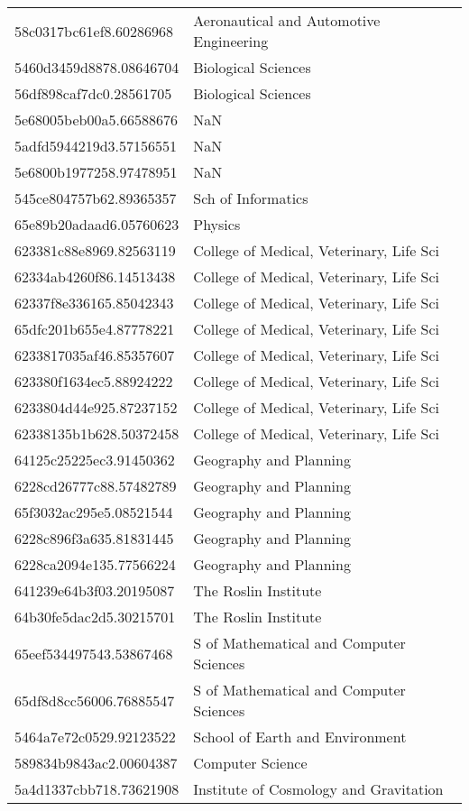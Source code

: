 \begin{tabular}{ll}
58c0317bc61ef8.60286968 & Aeronautical and Automotive Engineering \\
5460d3459d8878.08646704 & Biological Sciences \\
56df898caf7dc0.28561705 & Biological Sciences \\
5e68005beb00a5.66588676 & NaN \\
5adfd5944219d3.57156551 & NaN \\
5e6800b1977258.97478951 & NaN \\
545ce804757b62.89365357 & Sch of Informatics \\
65e89b20adaad6.05760623 & Physics \\
623381c88e8969.82563119 & College of Medical, Veterinary, Life Sci \\
62334ab4260f86.14513438 & College of Medical, Veterinary, Life Sci \\
62337f8e336165.85042343 & College of Medical, Veterinary, Life Sci \\
65dfc201b655e4.87778221 & College of Medical, Veterinary, Life Sci \\
6233817035af46.85357607 & College of Medical, Veterinary, Life Sci \\
623380f1634ec5.88924222 & College of Medical, Veterinary, Life Sci \\
6233804d44e925.87237152 & College of Medical, Veterinary, Life Sci \\
62338135b1b628.50372458 & College of Medical, Veterinary, Life Sci \\
64125c25225ec3.91450362 & Geography and Planning \\
6228cd26777c88.57482789 & Geography and Planning \\
65f3032ac295e5.08521544 & Geography and Planning \\
6228c896f3a635.81831445 & Geography and Planning \\
6228ca2094e135.77566224 & Geography and Planning \\
641239e64b3f03.20195087 & The Roslin Institute \\
64b30fe5dac2d5.30215701 & The Roslin Institute \\
65eef534497543.53867468 & S of Mathematical and Computer Sciences \\
65df8d8cc56006.76885547 & S of Mathematical and Computer Sciences \\
5464a7e72c0529.92123522 & School of Earth and Environment \\
589834b9843ac2.00604387 & Computer Science \\
5a4d1337cbb718.73621908 & Institute of Cosmology and Gravitation \\

\end{tabular}
